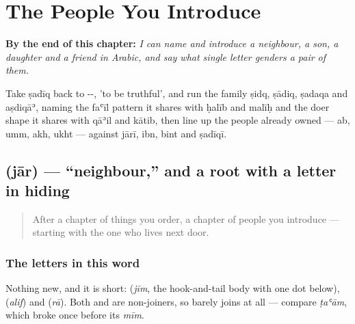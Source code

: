 
\chapter{The People You Introduce}
\label{ch:ar-people-you-introduce}

\begin{chapteropening}
\textbf{By the end of this chapter:} \emph{I can name and introduce a neighbour, a son, a daughter and a friend in Arabic, and say what single letter genders a pair of them.}

Take ṣadīq back to --, 'to be truthful', and run the family ṣidq, ṣādiq, ṣadaqa and aṣdiqāʾ, naming the faʿīl pattern it shares with ḥalīb and malīḥ and the doer shape it shares with qāʾil and kātib, then line up the people already owned — ab, umm, akh, ukht — against jārī, ibn, bint and ṣadīqī.
\end{chapteropening}

\section[\texorpdfstring{\ar{جار} (jār)}{جار (jār)}]{ (jār) — \textquotedblleft{}neighbour,\textquotedblright{} and a root with a letter in hiding}

\label{lesson:AR-C35-jar}



\begin{quote}
After a chapter of things you order, a chapter of people you introduce — starting with the one who lives next door.
\end{quote}

\subsection*{The letters in this word}
Nothing new, and it is short: \textbf{} (\emph{jīm}, the hook-and-tail body with one dot below), \textbf{} (\emph{alif}) and \textbf{} (\emph{rā}). Both \textbf{} and \textbf{} are non-joiners, so \textbf{} barely joins at all — compare \emph{ṭaʿām}, which broke once before its \emph{mīm}.

